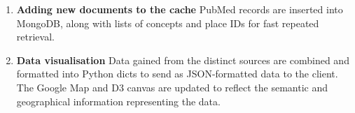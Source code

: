\documentclass[Report.tex]{subfiles}
\begin{document}
\begin{enumerate}
\item{\textbf{Adding new documents to the cache}}
\newline PubMed records are inserted into MongoDB, along with lists of concepts and place IDs for fast repeated retrieval.
\item{\textbf{Data visualisation}}
\newline Data gained from the distinct sources are combined and formatted into Python dicts to send as JSON-formatted data to the client. The Google Map and D3 canvas are updated to reflect the semantic and geographical information representing the data.
\end{enumerate}
\end{document}
